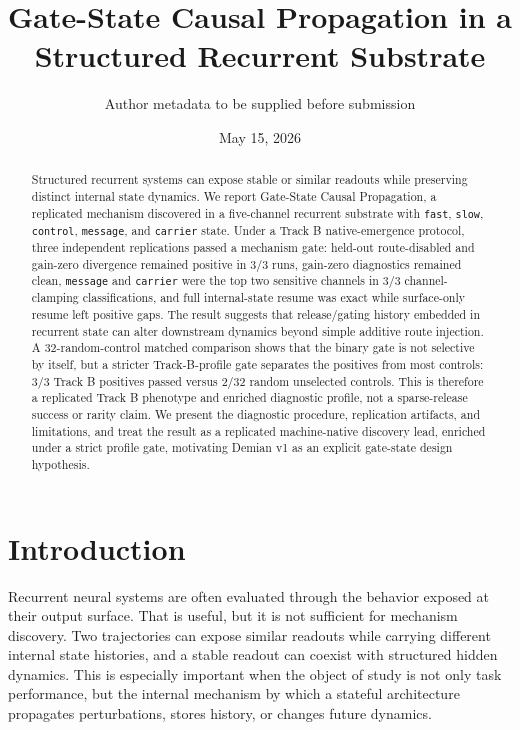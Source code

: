 \documentclass[11pt]{article}
\title{Gate-State Causal Propagation in a Structured Recurrent Substrate}
\author{Author metadata to be supplied before submission}
\date{May 15, 2026}
\begin{document}
\maketitle

\begin{abstract}
Structured recurrent systems can expose stable or similar readouts while
preserving distinct internal state dynamics. We report Gate-State Causal
Propagation, a replicated mechanism discovered in a five-channel recurrent
substrate with \texttt{fast}, \texttt{slow}, \texttt{control},
\texttt{message}, and \texttt{carrier} state. Under a Track B
native-emergence protocol, three independent replications passed a mechanism
gate: held-out route-disabled and gain-zero divergence remained positive in
3/3 runs, gain-zero diagnostics remained clean, \texttt{message} and
\texttt{carrier} were the top two sensitive channels in 3/3 channel-clamping
classifications, and full internal-state resume was exact while surface-only
resume left positive gaps. The result suggests that release/gating history
embedded in recurrent state can alter downstream dynamics beyond simple
additive route injection. A 32-random-control matched comparison shows that
the binary gate is not selective by itself, but a stricter Track-B-profile
gate separates the positives from most controls: 3/3 Track B positives passed
versus 2/32 random unselected controls. This is therefore a replicated Track B
phenotype and enriched diagnostic profile, not a sparse-release success or
rarity claim. We present the diagnostic procedure, replication artifacts, and
limitations, and treat the result as a replicated machine-native discovery
lead, enriched under a strict profile gate, motivating Demian v1 as an explicit
gate-state design hypothesis.
\end{abstract}

\section{Introduction}

Recurrent neural systems are often evaluated through the behavior exposed at
their output surface. That is useful, but it is not sufficient for mechanism
discovery. Two trajectories can expose similar readouts while carrying
different internal state histories, and a stable readout can coexist with
structured hidden dynamics. This is especially important when the object of
study is not only task performance, but the internal mechanism by which a
stateful architecture propagates perturbations, stores history, or changes
future dynamics.
\end{document}
